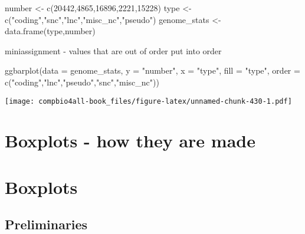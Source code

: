 \documentclass[
]{book}
\newenvironment{Shaded}{\begin{snugshade}}{\end{snugshade}}
\newcommand{\AttributeTok}[1]{\textcolor[rgb]{0.77,0.63,0.00}{#1}}
\newcommand{\DecValTok}[1]{\textcolor[rgb]{0.00,0.00,0.81}{#1}}
\newcommand{\FunctionTok}[1]{\textcolor[rgb]{0.00,0.00,0.00}{#1}}
\newcommand{\NormalTok}[1]{#1}
\newcommand{\OtherTok}[1]{\textcolor[rgb]{0.56,0.35,0.01}{#1}}
\newcommand{\StringTok}[1]{\textcolor[rgb]{0.31,0.60,0.02}{#1}}
\begin{document}
\begin{Shaded}
\begin{Highlighting}[]
\NormalTok{number }\OtherTok{\textless{}{-}} \FunctionTok{c}\NormalTok{(}\DecValTok{20442}\NormalTok{,}\DecValTok{4865}\NormalTok{,}\DecValTok{16896}\NormalTok{,}\DecValTok{2221}\NormalTok{,}\DecValTok{15228}\NormalTok{)}
\NormalTok{type }\OtherTok{\textless{}{-}} \FunctionTok{c}\NormalTok{(}\StringTok{"coding"}\NormalTok{,}\StringTok{"snc"}\NormalTok{,}\StringTok{"lnc"}\NormalTok{,}\StringTok{"misc\_nc"}\NormalTok{,}\StringTok{"pseudo"}\NormalTok{)}
\NormalTok{genome\_stats }\OtherTok{\textless{}{-}} \FunctionTok{data.frame}\NormalTok{(type,number)}
\end{Highlighting}
\end{Shaded}

miniassignment - values that are out of order put into order

\begin{Shaded}
\begin{Highlighting}[]
\FunctionTok{ggbarplot}\NormalTok{(}\AttributeTok{data =}\NormalTok{ genome\_stats,}
          \AttributeTok{y =} \StringTok{"number"}\NormalTok{,}
          \AttributeTok{x =} \StringTok{"type"}\NormalTok{, }
         \AttributeTok{fill =} \StringTok{"type"}\NormalTok{,}
         \AttributeTok{order =} \FunctionTok{c}\NormalTok{(}\StringTok{"coding"}\NormalTok{,}\StringTok{"lnc"}\NormalTok{,}\StringTok{"pseudo"}\NormalTok{,}\StringTok{"snc"}\NormalTok{,}\StringTok{"misc\_nc"}\NormalTok{))}
\end{Highlighting}
\end{Shaded}

\texttt{[image: compbio4all-book\_files/figure-latex/unnamed-chunk-430-1.pdf]}

\hypertarget{boxplots---how-they-are-made}{%
\chapter{Boxplots - how they are made}\label{boxplots---how-they-are-made}}

\hypertarget{boxplots-1}{%
\chapter{Boxplots}\label{boxplots-1}}

\hypertarget{preliminaries-8}{%
\section{Preliminaries}\label{preliminaries-8}}
\end{document}
